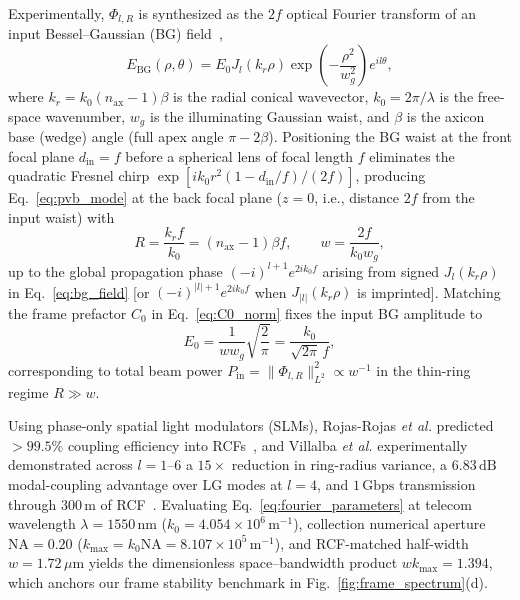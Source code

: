 \documentclass[aps,pra,onecolumn,notitlepage,11pt,tightenlines,amsmath,amssymb,floatfix,longbibliography]{revtex4-2}
\providecommand{\abs}[1]{\lvert#1\rvert}
\providecommand{\norm}[1]{\lVert#1\rVert}
\begin{document}
Experimentally, $\Phi_{l,R}$ is synthesized as the $2f$ optical Fourier transform of an input Bessel--Gaussian (BG) field~\cite{Gori1987,Vaity2015},
\begin{equation}
E_{\mathrm{BG}}(\rho,\theta) = E_0 J_l(k_r\rho)\exp\!\left(-\frac{\rho^2}{w_g^2}\right) e^{il\theta},
\label{eq:bg_field}
\end{equation}
where $k_r = k_0(n_{\mathrm{ax}}-1)\beta$ is the radial conical wavevector, $k_0 = 2\pi/\lambda$ is the free-space wavenumber, $w_g$ is the illuminating Gaussian waist, and $\beta$ is the axicon base (wedge) angle (full apex angle $\pi - 2\beta$). Positioning the BG waist at the front focal plane $d_{\mathrm{in}} = f$ before a spherical lens of focal length $f$ eliminates the quadratic Fresnel chirp $\exp[i k_0 r^2(1-d_{\mathrm{in}}/f)/(2f)]$, producing Eq.~\eqref{eq:pvb_mode} at the back focal plane ($z = 0$, i.e., distance $2f$ from the input waist) with~\cite{Vaity2015,Villalba2023}
\begin{equation}
R = \frac{k_r f}{k_0} = (n_{\mathrm{ax}}-1)\beta f, \qquad w = \frac{2f}{k_0 w_g},
\label{eq:fourier_parameters}
\end{equation}
up to the global propagation phase $(-i)^{l+1} e^{2ik_0 f}$ arising from signed $J_l(k_r\rho)$ in Eq.~\eqref{eq:bg_field} [or $(-i)^{\abs{l}+1} e^{2ik_0 f}$ when $J_{\abs{l}}(k_r\rho)$ is imprinted]. Matching the frame prefactor $C_0$ in Eq.~\eqref{eq:C0_norm} fixes the input BG amplitude to
\begin{equation}
E_0 = \frac{1}{w w_g}\sqrt{\frac{2}{\pi}} = \frac{k_0}{\sqrt{2\pi}\,f},
\label{eq:E0_scaling}
\end{equation}
corresponding to total beam power $P_{\mathrm{in}} = \norm{\Phi_{l,R}}_{L^2}^2 \propto w^{-1}$ in the thin-ring regime $R \gg w$.

Using phase-only spatial light modulators (SLMs), Rojas-Rojas \emph{et al.} predicted $>99.5\%$ coupling efficiency into RCFs~\cite{RojasRojas2021}, and Villalba \emph{et al.} experimentally demonstrated across $l = 1\text{--}6$ a $15\times$ reduction in ring-radius variance, a $6.83\,\mathrm{dB}$ modal-coupling advantage over $\mathrm{LG}$ modes at $l = 4$, and $1\,\mathrm{Gbps}$ transmission through $300\,\mathrm{m}$ of RCF~\cite{Villalba2023}. Evaluating Eq.~\eqref{eq:fourier_parameters} at telecom wavelength $\lambda = 1550\,\mathrm{nm}$ ($k_0 = 4.054\times 10^6\,\mathrm{m}^{-1}$), collection numerical aperture $\mathrm{NA} = 0.20$ ($k_{\max} = k_0\mathrm{NA} = 8.107\times 10^5\,\mathrm{m}^{-1}$), and RCF-matched half-width $w = 1.72\,\mu\mathrm{m}$ yields the dimensionless space--bandwidth product $w k_{\max} = 1.394$, which anchors our frame stability benchmark in Fig.~\ref{fig:frame_spectrum}(d).
\end{document}
